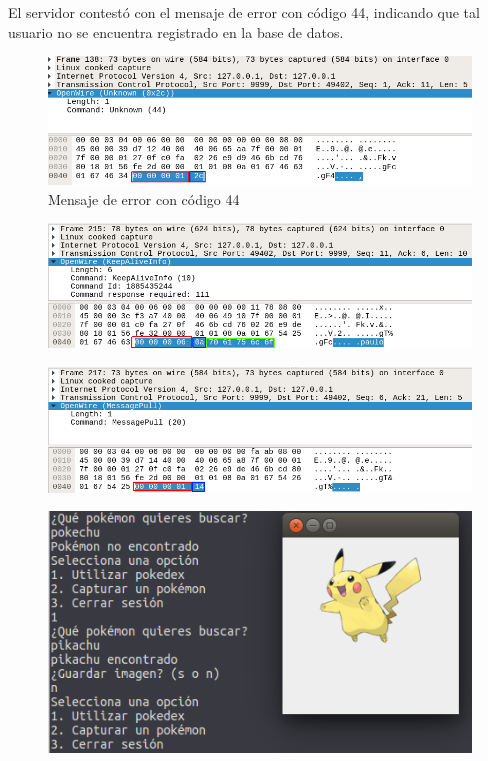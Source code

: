 \documentclass[12pt]{article}
\begin{document}
El servidor contestó con el mensaje de error con código 44, indicando que tal usuario no se encuentra registrado en la base de datos.
\begin{figure}[H]
  \centering
  \includegraphics[width=\textwidth]{04}
  \caption{Mensaje de error con código 44}
\end{figure}

\begin{figure}[H]
  \centering
  \includegraphics[width=\textwidth]{05}
  \caption{}
\end{figure}

\begin{figure}[H]
  \centering
  \includegraphics[width=\textwidth]{06}
  \caption{}
\end{figure}

\begin{figure}[H]
  \centering
  \includegraphics[width=\textwidth]{07}
  \caption{}
\end{figure}
\end{document}
